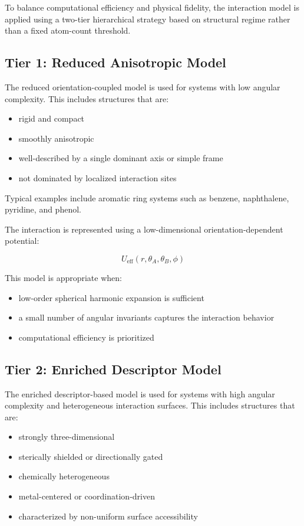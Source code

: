 \documentclass[11pt]{article}
\begin{document}
To balance computational efficiency and physical fidelity, the interaction model is applied using a two-tier hierarchical strategy based on structural regime rather than a fixed atom-count threshold.

\subsection{Tier 1: Reduced Anisotropic Model}

The reduced orientation-coupled model is used for systems with low angular complexity. This includes structures that are:

\begin{itemize}
    \item rigid and compact
    \item smoothly anisotropic
    \item well-described by a single dominant axis or simple frame
    \item not dominated by localized interaction sites
\end{itemize}

Typical examples include aromatic ring systems such as benzene, naphthalene, pyridine, and phenol.

The interaction is represented using a low-dimensional orientation-dependent potential:

\begin{equation}
U_{\text{eff}}(r,\theta_A,\theta_B,\phi)
\end{equation}

This model is appropriate when:
\begin{itemize}
    \item low-order spherical harmonic expansion is sufficient
    \item a small number of angular invariants captures the interaction behavior
    \item computational efficiency is prioritized
\end{itemize}

\subsection{Tier 2: Enriched Descriptor Model}

The enriched descriptor-based model is used for systems with high angular complexity and heterogeneous interaction surfaces. This includes structures that are:

\begin{itemize}
    \item strongly three-dimensional
    \item sterically shielded or directionally gated
    \item chemically heterogeneous
    \item metal-centered or coordination-driven
    \item characterized by non-uniform surface accessibility
\end{itemize}
\end{document}
